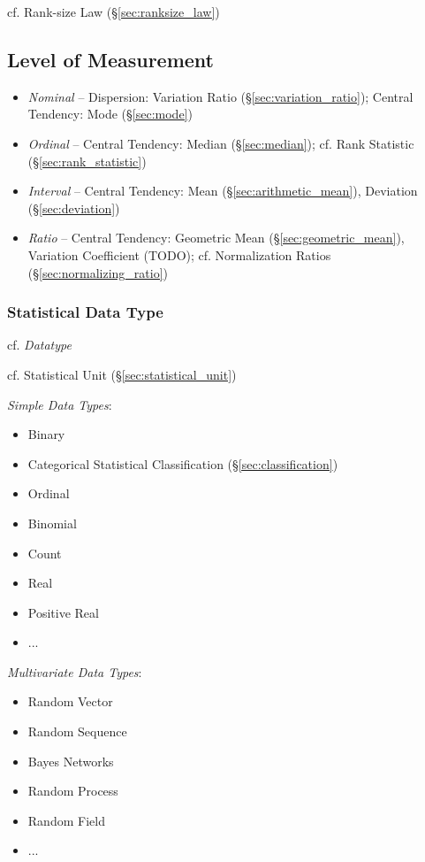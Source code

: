 cf. Rank-size Law (\S\ref{sec:ranksize_law})



\subsection{Level of Measurement}\label{sec:measurement_level}

\begin{itemize}
  \item \emph{Nominal} -- Dispersion: Variation Ratio
    (\S\ref{sec:variation_ratio}); Central Tendency: Mode (\S\ref{sec:mode})
  \item \emph{Ordinal} -- Central Tendency: Median (\S\ref{sec:median});
    cf. Rank Statistic (\S\ref{sec:rank_statistic})
  \item \emph{Interval} -- Central Tendency: Mean (\S\ref{sec:arithmetic_mean}),
    Deviation (\S\ref{sec:deviation})
  \item \emph{Ratio} -- Central Tendency: Geometric Mean
    (\S\ref{sec:geometric_mean}), Variation Coefficient (TODO);
    cf. Normalization Ratios (\S\ref{sec:normalizing_ratio})
\end{itemize}



\subsubsection{Statistical Data Type}\label{sec:statistical_data_type}

\fist cf. \emph{Datatype}

cf. Statistical Unit (\S\ref{sec:statistical_unit})

\emph{Simple Data Types}:
\begin{itemize}
  \item Binary
  \item Categorical
    \fist Statistical Classification (\S\ref{sec:classification})
  \item Ordinal
  \item Binomial
  \item Count
  \item Real
  \item Positive Real
  \item ...
\end{itemize}

\emph{Multivariate Data Types}:
\begin{itemize}
  \item Random Vector
  \item Random Sequence
  \item Bayes Networks
  \item Random Process
  \item Random Field
  \item ...
\end{itemize}

